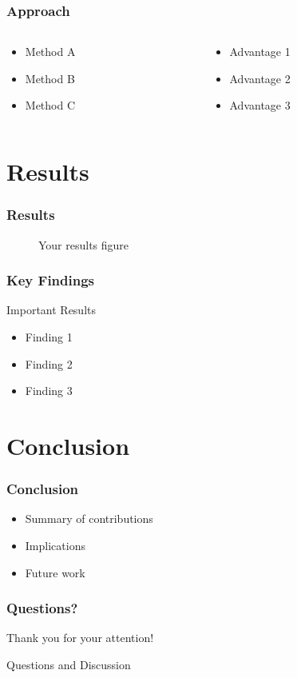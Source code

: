 \documentclass{beamer}
\begin{document}
\begin{frame}
\frametitle{Approach}
\begin{columns}
\begin{column}{0.5\textwidth}
\begin{itemize}
    \item Method A
    \item Method B
    \item Method C
\end{itemize}
\end{column}
\begin{column}{0.5\textwidth}
\begin{itemize}
    \item Advantage 1
    \item Advantage 2
    \item Advantage 3
\end{itemize}
\end{column}
\end{columns}
\end{frame}

\section{Results}
\begin{frame}
\frametitle{Results}
\begin{figure}
\centering
\caption{Your results figure}
\end{figure}
\end{frame}

\begin{frame}
\frametitle{Key Findings}
\begin{alertblock}{Important Results}
\begin{itemize}
    \item Finding 1
    \item Finding 2
    \item Finding 3
\end{itemize}
\end{alertblock}
\end{frame}

\section{Conclusion}
\begin{frame}
\frametitle{Conclusion}
\begin{itemize}
    \item Summary of contributions
    \item Implications
    \item Future work
\end{itemize}
\end{frame}

\begin{frame}
\frametitle{Questions?}
\begin{center}
\Large Thank you for your attention!

\vspace{1cm}
Questions and Discussion
\end{center}
\end{frame}
\end{document}
